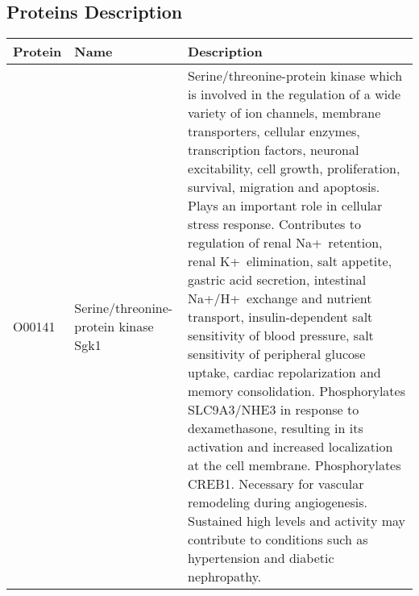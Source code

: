 \begin{landscape}
\section{Proteins Description}
\setcounter{page}{41}
\begin{table}[H]
    \caption[Protein Description]{Description of proteins used in the thesis work. Source: https://www.ncbi.nlm.nih.gov/pubmed/ }
    \label{table:protein descriptions}
    \begin{longtable}{|p{1.5cm}|p{3.7cm}|p{18cm}|}
        \hline
        
        Protein & Name & Description \\ \hline \toprule \hline
        O00141 & Serine/threonine-protein kinase Sgk1 & Serine/threonine-protein kinase which is involved in the regulation of a wide variety of ion channels, membrane transporters, cellular enzymes, transcription factors, neuronal excitability, cell growth, proliferation, survival, migration and apoptosis. Plays an important role in cellular stress response. Contributes to regulation of renal Na+ retention, renal K+ elimination, salt appetite, gastric acid secretion, intestinal Na+/H+ exchange and nutrient transport, insulin-dependent salt sensitivity of blood pressure, salt sensitivity of peripheral glucose uptake, cardiac repolarization and memory consolidation. Phosphorylates SLC9A3/NHE3 in response to dexamethasone, resulting in its activation and increased localization at the cell membrane. Phosphorylates CREB1. Necessary for vascular remodeling during angiogenesis. Sustained high levels and activity may contribute to conditions such as hypertension and diabetic nephropathy. \\ \hline

\end{longtable}
\end{table}
\end{landscape}
